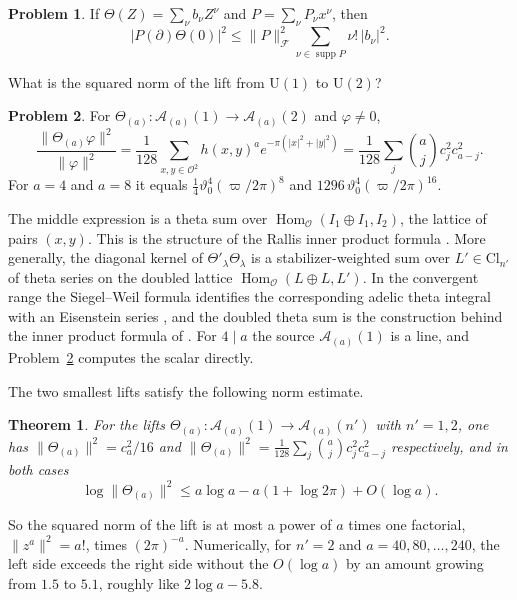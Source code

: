 \documentclass[reqno]{amsart}
\theoremstyle{definition}
\newtheorem{problem}{Problem}[section]
\theoremstyle{plain}
\newtheorem{theorem}{Theorem}[section]
\newcommand{\Oc}{\mathcal{O}}
\newcommand{\Ac}{\mathcal{A}}
\newcommand{\Fc}{\mathcal{F}}
\newcommand{\Cl}{\mathrm{Cl}}
\newcommand{\Hom}{\operatorname{Hom}}
\begin{document}
\begin{problem}\label{pr:CS}
If \(\Theta(Z) = \sum_\nu b_\nu Z^\nu\) and \(P = \sum_\nu P_\nu x^\nu\), then
\[
  \lvert P(\partial)\Theta(0) \rvert^2 \le \lVert P \rVert_{\Fc}^2 \sum_{\nu \in \operatorname{supp} P} \nu!\, \lvert b_\nu \rvert^2 .
\]
\end{problem}

What is the squared norm of the lift from \(\mathrm{U}(1)\) to \(\mathrm{U}(2)\)?

\begin{problem}\label{pr:rallis}
For \(\Theta_{(a)} \colon \Ac_{(a)}(1) \to \Ac_{(a)}(2)\) and \(\varphi \ne 0\),
\[
  \frac{\lVert \Theta_{(a)}\varphi \rVert^2}{\lVert \varphi \rVert^2}
  = \frac{1}{128} \sum_{x, y \in \Oc^2} h(x,y)^a e^{-\pi(\lvert x\rvert^2 + \lvert y\rvert^2)}
  = \frac{1}{128} \sum_j \binom{a}{j} c_j^2 c_{a-j}^2 .
\]
For \(a = 4\) and \(a = 8\) it equals \(\tfrac14 \vartheta_0^4 (\varpi/2\pi)^8\) and \(1296\, \vartheta_0^4 (\varpi/2\pi)^{16}\).
\end{problem}

The middle expression is a theta sum over \(\Hom_\Oc(I_1 \oplus I_1, I_2)\), the lattice of pairs \((x, y)\).  This is the structure of the Rallis inner product formula \cite{Ra}.  More generally, the diagonal kernel of \(\Theta'_\lambda\Theta_\lambda\) is a stabilizer-weighted sum over \(L'\in\Cl_{n'}\) of theta series on the doubled lattice \(\Hom_\Oc(L\oplus L,L')\).  In the convergent range the Siegel--Weil formula identifies the corresponding adelic theta integral with an Eisenstein series \cite{We65}, and the doubled theta sum is the construction behind the inner product formula of \cite[\S1]{Ra}.  For \(4 \mid a\) the source \(\Ac_{(a)}(1)\) is a line, and Problem~\ref{pr:rallis} computes the scalar directly.

The two smallest lifts satisfy the following norm estimate.

\begin{theorem}\label{thm:norm}
For the lifts \(\Theta_{(a)} \colon \Ac_{(a)}(1) \to \Ac_{(a)}(n')\) with \(n' = 1, 2\), one has \(\lVert \Theta_{(a)} \rVert^2 = c_a^2/16\) and \(\lVert \Theta_{(a)} \rVert^2 = \tfrac{1}{128}\sum_j \binom{a}{j} c_j^2 c_{a-j}^2\) respectively, and in both cases
\[
  \log \lVert \Theta_{(a)} \rVert^2 \le a \log a - a(1 + \log 2\pi) + O(\log a) .
\]
\end{theorem}

So the squared norm of the lift is at most a power of \(a\) times one factorial, \(\lVert z^a \rVert^2 = a!\), times \((2\pi)^{-a}\).  Numerically, for \(n' = 2\) and \(a = 40, 80, \dots, 240\), the left side exceeds the right side without the \(O(\log a)\) by an amount growing from \(1.5\) to \(5.1\), roughly like \(2\log a - 5.8\).
\end{document}
